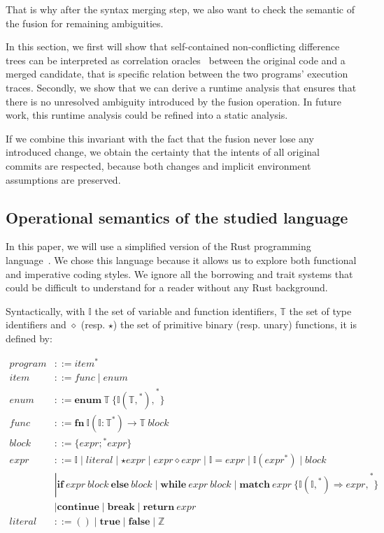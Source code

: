 \documentclass[a4paper,11pt]{article}
\newcommand\typsep{\mathrel{|}}
\newcommand\yrg[1]{{\color{red}{(\textbf{YRG:} #1)}}}
\begin{document}
That is why after the syntax merging step, we also want to check the
semantic of the fusion for remaining ambiguities.

In this section, we first will show that self-contained
non-conflicting difference trees can be interpreted as correlation
oracles~\yrg{Ref} between the original code and a merged candidate,
that is specific relation between the two programs' execution
traces. Secondly, we show that we can derive a runtime analysis that
ensures that there is no unresolved ambiguity introduced by the fusion
operation. In future work, this runtime analysis could be refined into
a static analysis.

If we combine this invariant with the fact that the fusion never lose
any introduced change, we obtain the certainty that the intents of all
original commits are respected, because both changes and implicit
environment assumptions are preserved.

\subsection{Operational semantics of the studied language}

In this paper, we will use a simplified version of the Rust
programming language~\yrg{Ref}. We chose this language because it
allows us to explore both functional and imperative coding styles.  We
ignore all the borrowing and trait systems that could be difficult to
understand for a reader without any Rust background.

\newcommand{\ident}{\mathbb{I}}
\newcommand{\typ}{\mathbb{T}}

Syntactically, with $\ident$ the set of variable and function
identifiers, $\typ$ the set of type identifiers and $\diamond$
(resp. $\star$) the set of primitive binary (resp. unary) functions,
it is defined by:

\begin{align*}
program &::= \boxed{item}^*\\
item &::= func \typsep enum\\
enum &::= \mathbf{enum}\ \typ\ \{ \boxed{\ident(\boxed{\typ,}^*),}^* \}\\
func &::= \mathbf{fn}\ \ident(\boxed{\ident: \typ}^*) \rightarrow \typ\ block\\
block &::= \{ \boxed{expr;}^* expr \}\\
expr &::= \ident \typsep literal \typsep \star expr \typsep expr \diamond expr \typsep \ident = expr \typsep \ident(\boxed{expr}^*) \typsep block\\
&\typsep \mathbf{if}\ expr\ block\ \mathbf{else}\ block \typsep \mathbf{while}\ expr\ block \typsep \mathbf{match}\ expr\ \{ \boxed{\ident(\boxed{\ident,}^*) \Rightarrow expr,}^* \}\\
&\typsep \mathbf{continue} \typsep \mathbf{break} \typsep \textbf{return}\ expr\\
literal &::= () \typsep \mathbf{true} \typsep \mathbf {false} \typsep \mathbb{Z}
\end{align*}
\end{document}

